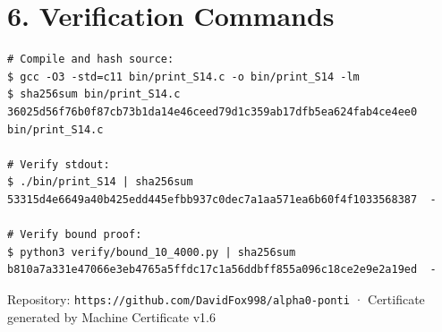 \documentclass[11pt,letterpaper]{article}
\begin{document}
\section*{6. Verification Commands}

\begin{lstlisting}
# Compile and hash source:
$ gcc -O3 -std=c11 bin/print_S14.c -o bin/print_S14 -lm
$ sha256sum bin/print_S14.c
36025d56f76b0f87cb73b1da14e46ceed79d1c359ab17dfb5ea624fab4ce4ee0  bin/print_S14.c

# Verify stdout:
$ ./bin/print_S14 | sha256sum
53315d4e6649a40b425edd445efbb937c0dec7a1aa571ea6b60f4f1033568387  -

# Verify bound proof:
$ python3 verify/bound_10_4000.py | sha256sum
b810a7a331e47066e3eb4765a5ffdc17c1a56ddbff855a096c18ce2e9e2a19ed  -
\end{lstlisting}

\vspace{0.5em}
\noindent\small Repository: \texttt{https://github.com/DavidFox998/alpha0-ponti} ·
Certificate generated by Machine Certificate v1.6
\end{document}
